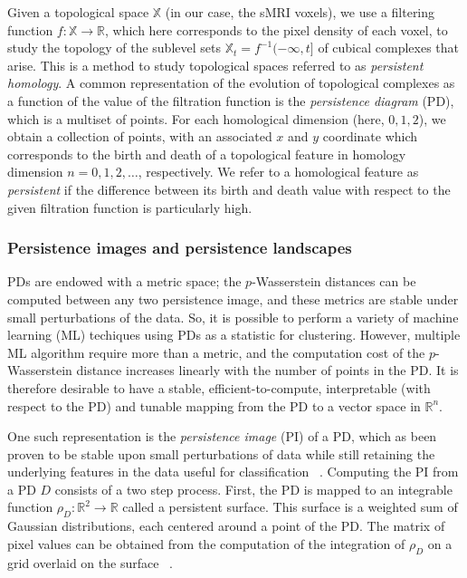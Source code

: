 \documentclass{article}
\begin{document}
Given a topological space $\mathbb{X}$ (in our case, the sMRI voxels), we use a filtering function $f:\mathbb{X}\to\mathbb{R}$, which here corresponds to the pixel density of each voxel, to study the topology of the sublevel sets $\mathbb{X}_t=f^{-1}(-\infty, t]$ of cubical complexes that arise. This is a method to study topological spaces referred to as \emph{persistent homology}. A common representation of the evolution of topological complexes as a function of the value of the filtration function is the \emph{persistence diagram} (PD), which is a multiset of points. For each homological dimension (here, $0,1,2$), we obtain a collection of points, with an associated $x$ and $y$ coordinate which corresponds to the birth and death of a topological feature in homology dimension $n=0,1,2,\ldots$, respectively. We refer to a homological feature as \emph{persistent} if the difference between its birth and death value with respect to the given filtration function is particularly high.


\subsubsection{Persistence images and persistence landscapes}\label{sec:theory_persistence_landscape_persistence_image}

PDs are endowed with a metric space; the $p$-Wasserstein distances can be computed between any two persistence image, and these metrics are stable under small perturbations of the data. So, it is possible to perform a variety of machine learning (ML) techiques using PDs as a statistic for clustering. However, multiple ML algorithm require more than a metric, and the computation cost of the $p$-Wasserstein distance increases linearly with the number of points in the PD. It is therefore desirable to have a stable, efficient-to-compute, interpretable (with respect to the PD) and tunable mapping from the PD to a vector space in $\mathbb{R}^n$.

One such representation is the \emph{persistence image} (PI) of a PD, which as been proven to be stable upon small perturbations of data while still retaining the underlying features in the data useful for classification ~\citep{adams2017persistence}. Computing the PI from a PD $D$ consists of a two step process. First, the PD is mapped to an integrable function $\rho_D : \mathbb{R}^2\to \mathbb{R}$ called a persistent surface. This surface is a weighted sum of Gaussian distributions, each centered around a point of the PD. The matrix of pixel values can be obtained from the computation of the integration of $\rho_D$ on a grid overlaid on the surface ~\citep{adams2017persistence}.
\end{document}
